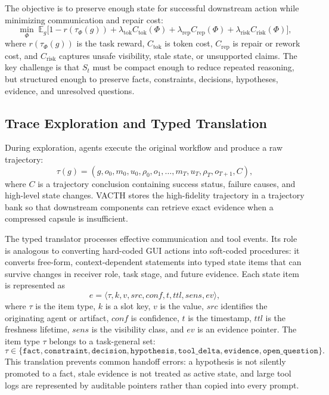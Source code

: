 \documentclass{article} %
\begin{document}
The objective is to preserve enough state for successful downstream action while minimizing communication and repair cost:
\begin{equation}
\min_{\Phi} \; \mathbb{E}_{g}\big[1-r(\tau_{\Phi}(g)) + \lambda_{\mathrm{tok}}C_{\mathrm{tok}}(\Phi) + \lambda_{\mathrm{rep}}C_{\mathrm{rep}}(\Phi) + \lambda_{\mathrm{risk}}C_{\mathrm{risk}}(\Phi)\big],
\end{equation}
where $r(\tau_{\Phi}(g))$ is the task reward, $C_{\mathrm{tok}}$ is token cost, $C_{\mathrm{rep}}$ is repair or rework cost, and $C_{\mathrm{risk}}$ captures unsafe visibility, stale state, or unsupported claims. The key challenge is that $S_t$ must be compact enough to reduce repeated reasoning, but structured enough to preserve facts, constraints, decisions, hypotheses, evidence, and unresolved questions.

\subsection{Trace Exploration and Typed Translation}

During exploration, agents execute the original workflow and produce a raw trajectory:
\begin{equation}
\tau(g)=(g,o_0,m_0,u_0,\rho_0,o_1,\ldots,m_T,u_T,\rho_T,o_{T+1},C),
\end{equation}
where $C$ is a trajectory conclusion containing success status, failure causes, and high-level state changes. VACTH stores the high-fidelity trajectory in a trajectory bank so that downstream components can retrieve exact evidence when a compressed capsule is insufficient.

The typed translator processes effective communication and tool events. Its role is analogous to converting hard-coded GUI actions into soft-coded procedures: it converts free-form, context-dependent statements into typed state items that can survive changes in receiver role, task stage, and future evidence. Each state item is represented as
\begin{equation}
e=\langle \tau, k, v, src, conf, t, ttl, sens, ev\rangle,
\end{equation}
where $\tau$ is the item type, $k$ is a slot key, $v$ is the value, $src$ identifies the originating agent or artifact, $conf$ is confidence, $t$ is the timestamp, $ttl$ is the freshness lifetime, $sens$ is the visibility class, and $ev$ is an evidence pointer. The item type $\tau$ belongs to a task-general set:
\begin{equation}
\tau \in \{\mathtt{fact},\mathtt{constraint},\mathtt{decision},\mathtt{hypothesis},\mathtt{tool\_delta},\mathtt{evidence},\mathtt{open\_question}\}.
\end{equation}
This translation prevents common handoff errors: a hypothesis is not silently promoted to a fact, stale evidence is not treated as active state, and large tool logs are represented by auditable pointers rather than copied into every prompt.
\end{document}
